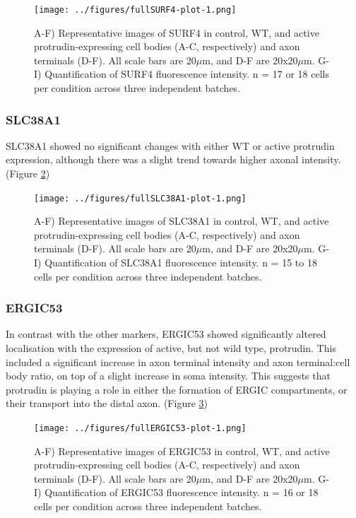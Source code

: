 \documentclass[
  12pt,
  a4paper,
]{book}
\begin{document}
\begin{figure}
\centering
\texttt{[image: ../figures/fullSURF4-plot-1.png]}
\caption{\label{fig:SURF4-plot}A-F) Representative images of SURF4 in control, WT, and active protrudin-expressing cell bodies (A-C, respectively) and axon terminals (D-F). All scale bars are 20\(\mu\)m, and D-F are 20x20\(\mu\)m. G-I) Quantification of SURF4 fluorescence intensity. n = 17 or 18 cells per condition across three independent batches.}
\end{figure}

\hypertarget{slc38a1}{%
\subsubsection{SLC38A1}\label{slc38a1}}

SLC38A1 showed no significant changes with either WT or active protrudin expression, although there was a slight trend towards higher axonal intensity. (Figure \ref{fig:SLC38A1-plot})

\begin{figure}
\centering
\texttt{[image: ../figures/fullSLC38A1-plot-1.png]}
\caption{\label{fig:SLC38A1-plot}A-F) Representative images of SLC38A1 in control, WT, and active protrudin-expressing cell bodies (A-C, respectively) and axon terminals (D-F). All scale bars are 20\(\mu\)m, and D-F are 20x20\(\mu\)m. G-I) Quantification of SLC38A1 fluorescence intensity. n = 15 to 18 cells per condition across three independent batches.}
\end{figure}

\hypertarget{ergic53}{%
\subsubsection{ERGIC53}\label{ergic53}}

In contrast with the other markers, ERGIC53 showed significantly altered localisation with the expression of active, but not wild type, protrudin. This included a significant increase in axon terminal intensity and axon terminal:cell body ratio, on top of a slight increase in soma intensity. This suggests that protrudin is playing a role in either the formation of ERGIC compartments, or their transport into the distal axon. (Figure \ref{fig:ERGIC53-plot})

\begin{figure}
\centering
\texttt{[image: ../figures/fullERGIC53-plot-1.png]}
\caption{\label{fig:ERGIC53-plot}A-F) Representative images of ERGIC53 in control, WT, and active protrudin-expressing cell bodies (A-C, respectively) and axon terminals (D-F). All scale bars are 20\(\mu\)m, and D-F are 20x20\(\mu\)m. G-I) Quantification of ERGIC53 fluorescence intensity. n = 16 or 18 cells per condition across three independent batches.}
\end{figure}
\end{document}
